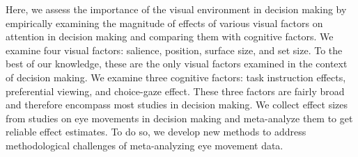 Here, we assess the importance of the visual environment in decision making by empirically examining the magnitude of effects of various visual factors on attention in decision making and comparing them with cognitive factors. We examine four visual factors: salience, position, surface size, and set size. To the best of our knowledge, these are the only visual factors examined in the context of decision making. We examine three cognitive factors: task instruction effects, preferential viewing, and choice-gaze effect. These three factors are fairly broad and therefore encompass most studies in decision making. We collect effect sizes from studies on eye movements in decision making and meta-analyze them to get reliable effect estimates. To do so, we develop new methods to address methodological challenges of meta-analyzing eye movement data.   
